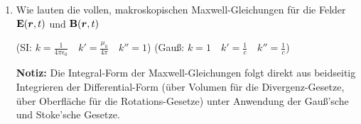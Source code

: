 \begin{enumerate}

  \item Wie lauten die vollen, makroskopischen Maxwell-Gleichungen für %
        die Felder $\vb E(\vb* r, t)$ und $\vb B(\vb* r, t)$
        \begin{center}
        (SI: $k=\frac{1}{4\pi\epsilon_0}\quad k'=\frac{\mu_0}{4\pi}\quad
                  k''=1$)
        (Gauß: $k=1\quad k'=\frac{1}{c}\quad
             k''=\frac{1}{c}$) 
        \end{center}
        \begin{center}
        \end{center}
        
        \textbf{Notiz:} Die Integral-Form der Maxwell-Gleichungen folgt
        direkt aus beidseitig Integrieren der Differential-Form (über 
        Volumen für die Divergenz-Gesetze, über Oberfläche für die 
        Rotations-Gesetze) unter Anwendung der Gauß'sche und 
        Stoke'sche Gesetze.


\end{enumerate}
